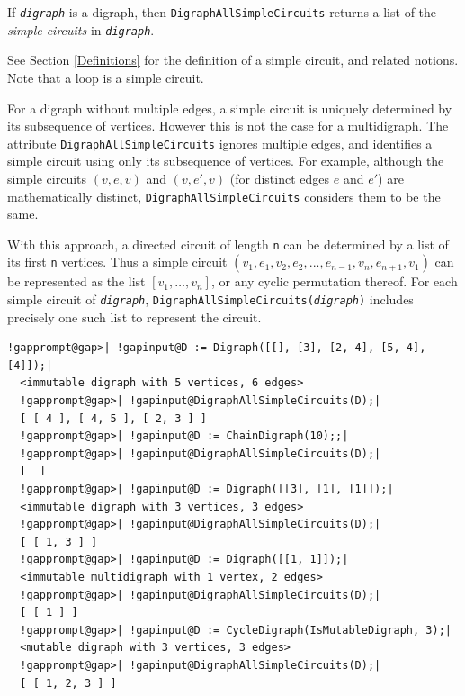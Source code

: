 \documentclass[a4paper,11pt]{report}
\begin{document}
{{{ If \mbox{\texttt{\mdseries\slshape digraph}} is a digraph, then \texttt{DigraphAllSimpleCircuits} returns a list of the \emph{simple circuits} in \mbox{\texttt{\mdseries\slshape digraph}}. 

 See Section \ref{Definitions} for the definition of a simple circuit, and related notions. Note that a loop
is a simple circuit. 

 For a digraph without multiple edges, a simple circuit is uniquely determined
by its subsequence of vertices. However this is not the case for a
multidigraph. The attribute \texttt{DigraphAllSimpleCircuits} ignores multiple edges, and identifies a simple circuit using only its
subsequence of vertices. For example, although the simple circuits $(v, e, v)$ and $(v, e', v)$ (for distinct edges $e$ and $e'$) are mathematically distinct, \texttt{DigraphAllSimpleCircuits} considers them to be the same. 

 With this approach, a directed circuit of length \texttt{n} can be determined by a list of its first \texttt{n} vertices. Thus a simple circuit $(v_1, e_1, v_2, e_2, ..., e_{n-1}, v_n, e_{n+1}, v_1)$ can be represented as the list $[v_1, \ldots, v_n]$, or any cyclic permutation thereof. For each simple circuit of \mbox{\texttt{\mdseries\slshape digraph}}, \texttt{DigraphAllSimpleCircuits(\mbox{\texttt{\mdseries\slshape digraph}})} includes precisely one such list to represent the circuit. 

 
\begin{Verbatim}[commandchars=!@|,fontsize=\small,frame=single,label=Example]
  !gapprompt@gap>| !gapinput@D := Digraph([[], [3], [2, 4], [5, 4], [4]]);|
  <immutable digraph with 5 vertices, 6 edges>
  !gapprompt@gap>| !gapinput@DigraphAllSimpleCircuits(D);|
  [ [ 4 ], [ 4, 5 ], [ 2, 3 ] ]
  !gapprompt@gap>| !gapinput@D := ChainDigraph(10);;|
  !gapprompt@gap>| !gapinput@DigraphAllSimpleCircuits(D);|
  [  ]
  !gapprompt@gap>| !gapinput@D := Digraph([[3], [1], [1]]);|
  <immutable digraph with 3 vertices, 3 edges>
  !gapprompt@gap>| !gapinput@DigraphAllSimpleCircuits(D);|
  [ [ 1, 3 ] ]
  !gapprompt@gap>| !gapinput@D := Digraph([[1, 1]]);|
  <immutable multidigraph with 1 vertex, 2 edges>
  !gapprompt@gap>| !gapinput@DigraphAllSimpleCircuits(D);|
  [ [ 1 ] ]
  !gapprompt@gap>| !gapinput@D := CycleDigraph(IsMutableDigraph, 3);|
  <mutable digraph with 3 vertices, 3 edges>
  !gapprompt@gap>| !gapinput@DigraphAllSimpleCircuits(D);|
  [ [ 1, 2, 3 ] ]
\end{Verbatim}
 }

 

}}
\end{document}
